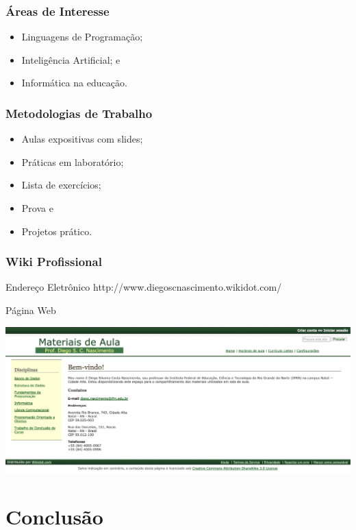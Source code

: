 \documentclass[aspectratio=169]{beamer}
\begin{document}
\begin{frame}
	\frametitle{Áreas de Interesse}
	
	\begin{itemize}
        		\item Linguagens de Programação;
		\item Inteligência Artificial; e
		\item Informática na educa\c cão.
	\end{itemize}
\end{frame}

\begin{frame}
	\frametitle{Metodologias de Trabalho}
	
	\begin{itemize}
		\item Aulas expositivas com slides;
		\item Práticas em laboratório;
		\item Lista de exercícios;
	    	\item Prova e 
		\item Projetos prático.
	\end{itemize}
\end{frame}

\begin{frame}
	\frametitle{Wiki Profissional}
	
	\begin{block}{Endereço Eletrônico}
	http://www.diegoscnascimento.wikidot.com/
	\end{block} \vfill
	
	\begin{exampleblock}{Página Web}
		\begin{center}
			\includegraphics[scale=0.2]{imagens/pagina}
		\end{center}
	\end{exampleblock}
\end{frame}

\section{Conclusão}
\end{document}
